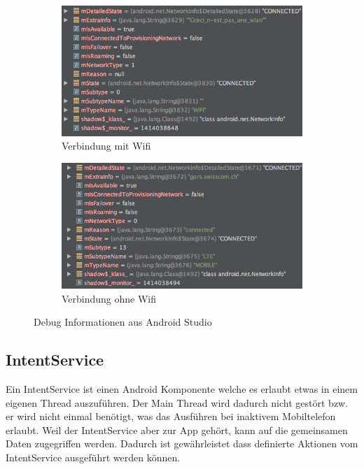 \begin{figure}[ht]
\centering
\begin{subfigure}[b]{0.8\textwidth}
  \centering
  \includegraphics[width=1\linewidth]{images/debugwifi.png}
  \caption{Verbindung mit Wifi}
  \label{fig:sub1}
\end{subfigure}

\begin{subfigure}[b]{0.8\textwidth}
  \centering
  \includegraphics[width=1\linewidth]{images/debugnowifi.png}
  \caption{Verbindung ohne Wifi}
  \label{fig:sub2}
\end{subfigure}
\caption{Debug Informationen aus Android Studio}
\label{fig:verbindungsinfo}
\end{figure}


\subsection{IntentService}
Ein IntentService ist einen Android Komponente welche es erlaubt etwas in einem eigenen Thread auszuführen. Der Main Thread wird dadurch nicht gestört bzw. er wird nicht einmal benötigt, was das Ausführen bei inaktivem Mobiltelefon erlaubt. Weil der IntentService aber zur App gehört, kann auf die gemeinsamen Daten zugegriffen werden. Dadurch ist gewährleistet dass definierte Aktionen vom IntentService ausgeführt werden können.
